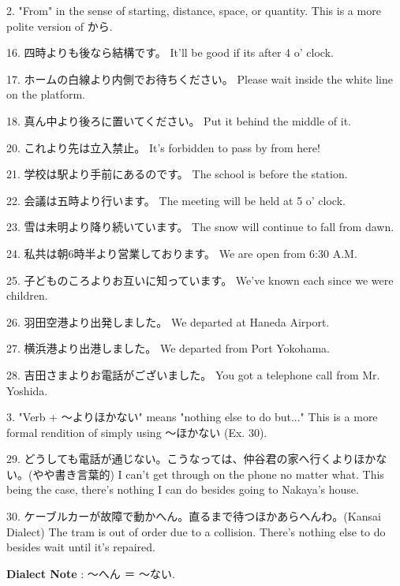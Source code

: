 \par{2. "From" in the sense of starting, distance, space, or quantity. This is a more polite version of から. }

\par{16. 四時よりも後なら結構です。 \hfill\break
It'll be good if its after 4 o' clock. }

\par{17. ホームの白線より内側でお待ちください。 \hfill\break
Please wait inside the white line on the platform. }

\par{18. 真ん中より後ろに置いてください。 \hfill\break
Put it behind the middle of it. }

\par{20. これより先は立入禁止。 \hfill\break
It's forbidden to pass by from here! }

\par{21. 学校は駅より手前にあるのです。 \hfill\break
The school is before the station. }

\par{22. 会議は五時より行います。 \hfill\break
The meeting will be held at 5 o' clock. }

\par{23. 雪は未明より降り続いています。 \hfill\break
The snow will continue to fall from dawn. }

\par{24. 私共は朝6時半より営業しております。 \hfill\break
We are open from 6:30 A.M. }

\par{25. 子どものころよりお互いに知っています。 \hfill\break
We've known each since we were children. }

\par{26. 羽田空港より出発しました。 \hfill\break
We departed at Haneda Airport. }

\par{27. 横浜港より出港しました。 \hfill\break
We departed from Port Yokohama. }

\par{28. 吉田さまよりお電話がございました。 \hfill\break
You got a telephone call from Mr. Yoshida. }

\par{3. "Verb + ～よりほかない" means "nothing else to do but\dothyp{}\dothyp{}\dothyp{}" This is a more formal rendition of simply using ～ほかない (Ex. 30). }

\par{29. どうしても電話が通じない。こうなっては、仲谷君の家へ行くよりほかない。(やや書き言葉的) \hfill\break
I can't get through on the phone no matter what. This being the case, there's nothing I can do besides going to Nakaya's house. }

\par{30. ケーブルカーが故障で動かへん。直るまで待つほかあらへんわ。(Kansai Dialect) \hfill\break
The tram is out of order due to a collision. There's nothing else to do besides wait until it's repaired. }

\par{\textbf{Dialect Note }: ～へん ＝ ～ない. }
    